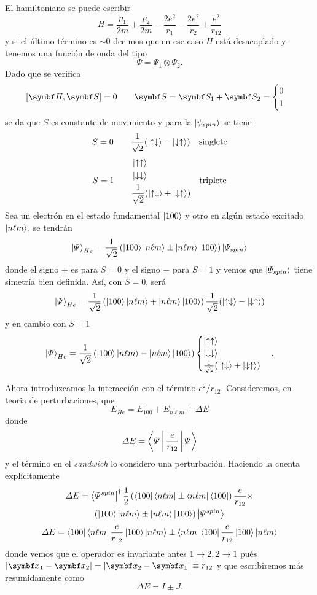 \documentclass[10pt,oneside]{CBFT_book}
\begin{document}
El hamiltoniano se puede escribir 
\[
	H = \frac{p_1}{2m} + \frac{p_2}{2m} - \frac{2e^2}{r_1} -  \frac{2e^2}{r_2} + \frac{e^2}{r_{12}}
\]
y si el último término es $\sim 0$ decimos que en ese caso $H$ está desacoplado y tenemos una
función de onda del tipo
\[
	\Psi = \Psi_1 \otimes \Psi_2.
\]
Dado que se verifica
\[
	[\vb{H},\vb{S}] = 0 
	\qquad 
	\vb{S} = \vb{S}_1 + \vb{S}_2 = 
	\begin{cases} 
	0 \\ 
	1 
	\end{cases}
\]
se da que $S$ es constante de movimiento y para la $\Ket{\psi_{spin}}$ se tiene 
\[
	S=0 \qquad \frac{1}{\sqrt{2}}( \Ket{ \uparrow\downarrow }-\Ket{ \downarrow\uparrow}) \quad \text{singlete}
\]
\[
	S=1 \qquad \begin{aligned}
	& \Ket{\uparrow \uparrow} \\
	& \Ket{\downarrow \downarrow } \\
	& \frac{1}{\sqrt{2}}( \Ket{ \uparrow\downarrow }+\Ket{ \downarrow\uparrow} )
	\end{aligned} \quad \text{triplete}
\]
Sea un electrón  en el estado fundamental $ \Ket{100}$ y otro en algún estado excitado $ \Ket{n\ell m}$,
se tendrán
\[
	\Ket{\Psi}_{He} = \frac{1}{\sqrt{2}}\left(  \Ket{100}\Ket{n\ell m} \pm  \Ket{n\ell m}\Ket{100}
	\right) \Ket{\Psi_{spin}}
\]
donde el signo $+$ es para $S=0$ y el signo $-$ para $S=1$ y vemos que $\Ket{\Psi_{spin}}$ tiene simetría
bien definida.
Así, con $S=0$, será
\[
	\Ket{\Psi}_{He} = \frac{1}{\sqrt{2}}\left( \Ket{100}\Ket{n\ell m} + \Ket{n\ell m}\Ket{100}\right) 
	\frac{1}{\sqrt{2}}( \Ket{ \uparrow\downarrow }-\Ket{ \downarrow\uparrow})
\]
y en cambio con $S=1$
\[
	\Ket{\Psi}_{He} = \frac{1}{\sqrt{2}}\left(  \Ket{100}\Ket{n\ell m} - \Ket{n\ell m}\Ket{100}\right) 
			\begin{cases}
	                   \Ket{\uparrow \uparrow} \\
			   \Ket{\downarrow \downarrow } \\
			   \frac{1}{\sqrt{2}}( \Ket{ \uparrow\downarrow }+\Ket{ \downarrow\uparrow} )
	                  \end{cases} .
\]

Ahora introduzcamos la interacción con el término $e^2/r_{12}$. Consideremos, en teoria de perturbaciones,
que 
\[
	E_{He} = E_{100} + E_{n\ell m} + \Delta E
\]
donde 
\[
	\Delta E = \Braket{\Psi|\frac{e}{r_{12}}|\Psi}
\]
y el término en el {\it sandwich} lo considero una perturbación.
Haciendo la cuenta explícitamente
\begin{multline*}
	\Delta E = \Bra{\Psi^{spin}}^\dagger \frac{1}{2}\left(\Bra{100}\Bra{n\ell m} \pm \Bra{n\ell m}\Bra{100}
	\right) \frac{e}{r_{12}} \times \\
	\left(\Ket{100}\Ket{n\ell m} \pm \Ket{n\ell m}\Ket{100}\right)\Ket{\Psi^{spin}}
\end{multline*}
\[
	\Delta E = \Bra{100}\Bra{n\ell m}\frac{e}{r_{12}}\Ket{100}\Ket{n\ell m} \pm  
	\Bra{n\ell m}\Bra{100}\frac{e}{r_{12}}\Ket{100}\Ket{n\ell m}
\]
donde vemos que el operador es invariante antes $1 \to 2, 2 \to 1$ pués $|\vbx_1 - \vbx_2| = |\vbx_2 - \vbx_1| 
\equiv r_{12}$ y que escribiremos más resumidamente como
\[
	\Delta E = I \pm J.
\]
\end{document}
